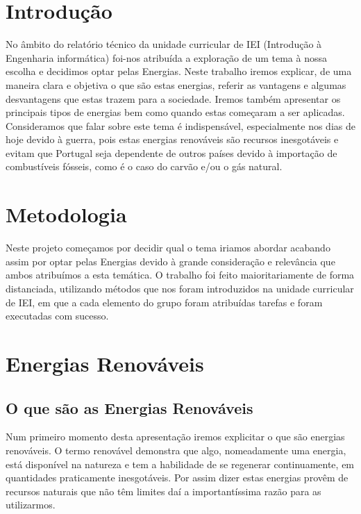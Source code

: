 \documentclass{report}
\begin{document}
\tableofcontents


\clearpage
{}

\chapter{Introdução}
\label{chap.introducao}
\Large
No âmbito do relatório técnico da unidade curricular de IEI (Introdução à Engenharia informática) foi-nos atribuída a exploração de um tema à nossa escolha e decidimos optar pelas Energias. Neste trabalho iremos explicar, de uma maneira clara e objetiva o que são estas energias, referir as vantagens e algumas desvantagens que estas trazem para a sociedade. Iremos também apresentar os principais tipos de energias bem como quando estas começaram a ser aplicadas. Consideramos que falar sobre este tema é indispensável, especialmente nos dias de hoje devido à guerra, pois estas energias renováveis são recursos inesgotáveis e evitam que Portugal seja dependente de outros países devido à importação de combustíveis fósseis, como é o caso do carvão e/ou o gás natural.


\chapter{Metodologia}
Neste projeto começamos por decidir qual o tema iriamos abordar acabando assim por optar pelas Energias devido à grande consideração e relevância que ambos atribuímos a esta temática. O trabalho foi feito maioritariamente de forma distanciada, utilizando métodos que nos foram introduzidos na unidade curricular de IEI, em que a cada elemento do grupo foram atribuídas tarefas e foram executadas com sucesso.

\label{chap.metodologia}

\chapter{Energias Renováveis}
\section{O que são as Energias Renováveis}
Num primeiro momento desta apresentação iremos explicitar o que são energias renováveis. O termo renovável demonstra que algo, nomeadamente uma energia, está disponível na natureza e tem a habilidade de se regenerar continuamente, em quantidades praticamente inesgotáveis. Por assim dizer estas energias provêm de recursos naturais que não têm limites daí a importantíssima razão para as utilizarmos.
\end{document}
